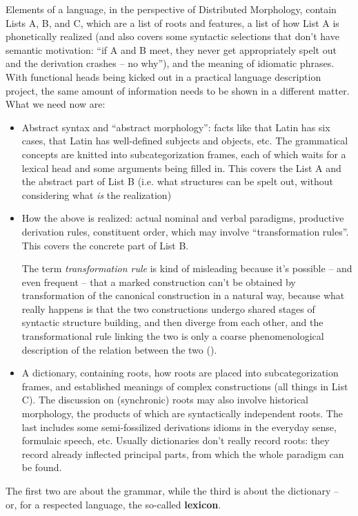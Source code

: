 \documentclass[a4paper, oneside]{report}
\newcommand*{\concept}[1]{\textbf{#1}}
\newcommand*{\term}[1]{\emph{#1}}
\begin{document}
Elements of a language, in the perspective of Distributed Morphology,
contain Lists A, B, and C, 
which are a list of roots and features, 
a list of how List A is phonetically realized 
(and also covers some syntactic selections that don't have semantic motivation: 
``if A and B meet, they never get appropriately spelt out and the derivation crashes -- no why''),
and the meaning of idiomatic phrases. 
With functional heads being kicked out in a practical language description project, 
the same amount of information needs to be shown in a different matter. 
What we need now are: 
\begin{itemize}
    \item Abstract syntax and ``abstract morphology'':
        facts like that Latin has six cases, 
        that Latin has well-defined subjects and objects, etc. 
        The grammatical concepts are knitted into subcategorization frames,
        each of which waits for a lexical head 
        and some arguments being filled in. 
        This covers the List A and the abstract part of List B 
        (i.e. what structures can be spelt out, 
        without considering what \emph{is} the realization)
    \item How the above is realized: 
        actual nominal and verbal paradigms, 
        productive derivation rules, 
        constituent order, which may involve ``transformation rules''.
        This covers 
        the concrete part of List B. 

        The term \term{transformation rule} is kind of misleading 
        because it's possible -- and even frequent -- 
        that a marked construction can't be obtained by transformation 
        of the canonical construction
        in a natural way, 
        because what really happens is 
        that the two constructions undergo shared stages of syntactic structure building,
        and then diverge from each other,
        and the transformational rule linking the two 
        is only a coarse phenomenological description of the relation between the two 
        ().
    \item A dictionary, 
        containing roots, how roots are placed into subcategorization frames, 
        and established meanings of complex constructions (all things in List C). 
        The discussion on (synchronic) roots may also involve 
        historical morphology,
        the products of which are syntactically independent roots.
        The last includes some semi-fossilized derivations 
        idioms in the everyday sense, formulaic speech, etc. 
        Usually dictionaries don't really record roots: 
        they record already inflected principal parts,
        from which the whole paradigm can be found.
\end{itemize}
The first two are about the grammar, 
while the third is about the dictionary -- 
or, for a respected language, the so-called \concept{lexicon}.
\end{document}
